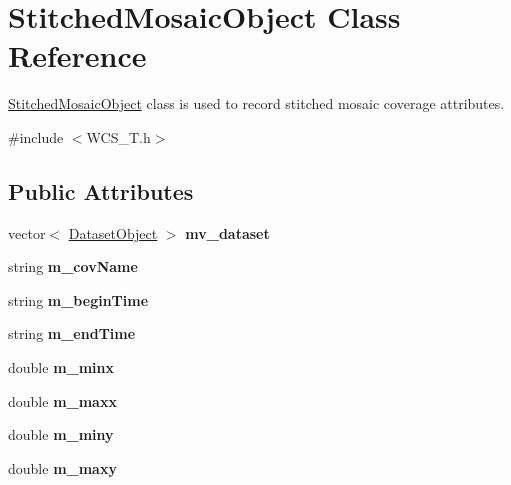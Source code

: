 \hypertarget{classStitchedMosaicObject}{
\section{StitchedMosaicObject Class Reference}
\label{classStitchedMosaicObject}
}


\hyperlink{classStitchedMosaicObject}{StitchedMosaicObject} class is used to record stitched mosaic coverage attributes.  




{\ttfamily \#include $<$WCS\_\-T.h$>$}

\subsection*{Public Attributes}
\begin{DoxyCompactItemize}
\item 
\hypertarget{classStitchedMosaicObject_aa5ed2331208efee194b57704ea79d042}{
vector$<$ \hyperlink{classDatasetObject}{DatasetObject} $>$ {\bfseries mv\_\-dataset}}
\label{classStitchedMosaicObject_aa5ed2331208efee194b57704ea79d042}

\item 
\hypertarget{classStitchedMosaicObject_a625fa7902cf715c5bd8df4399beb44ca}{
string {\bfseries m\_\-covName}}
\label{classStitchedMosaicObject_a625fa7902cf715c5bd8df4399beb44ca}

\item 
\hypertarget{classStitchedMosaicObject_a1b723345995e4f4c3f180b02136b6aa2}{
string {\bfseries m\_\-beginTime}}
\label{classStitchedMosaicObject_a1b723345995e4f4c3f180b02136b6aa2}

\item 
\hypertarget{classStitchedMosaicObject_ac3f2f4043f179fdbe3cbeac5002bf2cf}{
string {\bfseries m\_\-endTime}}
\label{classStitchedMosaicObject_ac3f2f4043f179fdbe3cbeac5002bf2cf}

\item 
\hypertarget{classStitchedMosaicObject_a938c2229ff00490cc2404d5b0621dbf2}{
double {\bfseries m\_\-minx}}
\label{classStitchedMosaicObject_a938c2229ff00490cc2404d5b0621dbf2}

\item 
\hypertarget{classStitchedMosaicObject_abf285c40f416556821bae49e73b79910}{
double {\bfseries m\_\-maxx}}
\label{classStitchedMosaicObject_abf285c40f416556821bae49e73b79910}

\item 
\hypertarget{classStitchedMosaicObject_a1a1dc03968ab40a41939835daa8ea154}{
double {\bfseries m\_\-miny}}
\label{classStitchedMosaicObject_a1a1dc03968ab40a41939835daa8ea154}

\item 
\hypertarget{classStitchedMosaicObject_ad472779a00ad7d333f4a5aeaa95c722c}{
double {\bfseries m\_\-maxy}}
\label{classStitchedMosaicObject_ad472779a00ad7d333f4a5aeaa95c722c}

\end{DoxyCompactItemize}


